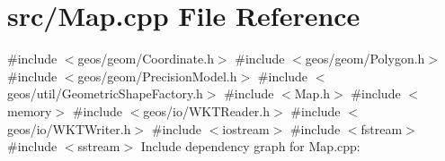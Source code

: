 \section{src/\+Map.cpp File Reference}
\label{_map_8cpp}
{\ttfamily \#include $<$geos/geom/\+Coordinate.\+h$>$}\newline
{\ttfamily \#include $<$geos/geom/\+Polygon.\+h$>$}\newline
{\ttfamily \#include $<$geos/geom/\+Precision\+Model.\+h$>$}\newline
{\ttfamily \#include $<$geos/util/\+Geometric\+Shape\+Factory.\+h$>$}\newline
{\ttfamily \#include $<$Map.\+h$>$}\newline
{\ttfamily \#include $<$memory$>$}\newline
{\ttfamily \#include $<$geos/io/\+W\+K\+T\+Reader.\+h$>$}\newline
{\ttfamily \#include $<$geos/io/\+W\+K\+T\+Writer.\+h$>$}\newline
{\ttfamily \#include $<$iostream$>$}\newline
{\ttfamily \#include $<$fstream$>$}\newline
{\ttfamily \#include $<$sstream$>$}\newline
Include dependency graph for Map.\+cpp\+:
